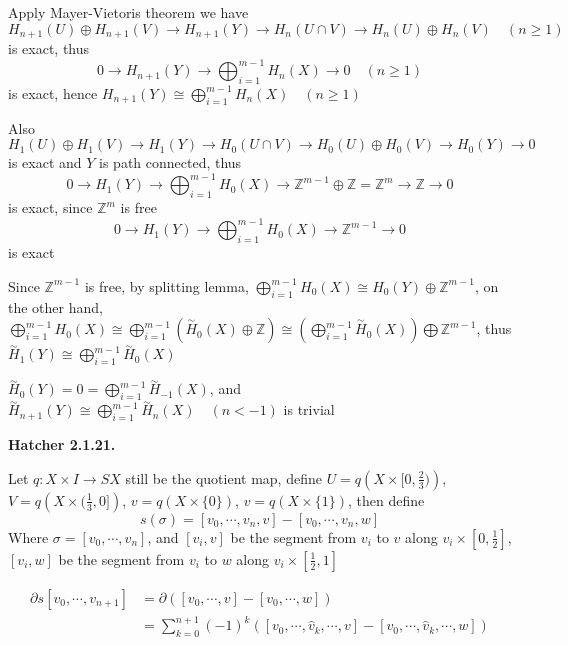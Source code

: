 \documentclass[../main.tex]{subfiles}
\begin{document}
Apply Mayer-Vietoris theorem we have
\[
H_{n+1}(U)\oplus H_{n+1}(V)\rightarrow H_{n+1}(Y)\rightarrow H_n(U\cap V)\rightarrow H_n(U)\oplus H_n(V) \quad (n\geq 1)
\]
is exact, thus
\[
0\rightarrow H_{n+1}(Y)\rightarrow \bigoplus_{i=1}^{m-1}H_n(X)\rightarrow 0 \quad (n\geq 1)
\]
is exact, hence $H_{n+1}(Y)\cong\bigoplus_{i=1}^{m-1}H_n(X)\quad (n\geq 1)$ \par
Also
\[
H_1(U)\oplus H_1(V)\rightarrow H_1(Y)\rightarrow H_0(U\cap V)\rightarrow H_0(U)\oplus H_0(V)\rightarrow H_0(Y)\rightarrow 0
\]
is exact and $Y$ is path connected, thus
\[
0\rightarrow H_1(Y)\rightarrow \bigoplus_{i=1}^{m-1}H_0(X)\rightarrow \mathbb{Z}^{m-1}\oplus\mathbb{Z}=\mathbb{Z}^m\rightarrow \mathbb{Z}\rightarrow 0
\]
is exact, since $\mathbb{Z}^m$ is free
\[
0\rightarrow H_1(Y)\rightarrow \bigoplus_{i=1}^{m-1}H_0(X)\rightarrow \mathbb{Z}^{m-1}\rightarrow 0
\]
is exact \par
Since $\mathbb{Z}^{m-1}$ is free, by splitting lemma, $\displaystyle\bigoplus_{i=1}^{m-1}H_0(X)\cong H_0(Y)\oplus\mathbb{Z}^{m-1}$, on the other hand, $\displaystyle\bigoplus_{i=1}^{m-1}H_0(X)\cong\bigoplus_{i=1}^{m-1}\left(\overset{\sim}{H}_0(X)\oplus\mathbb{Z}\right)\cong\left(\bigoplus_{i=1}^{m-1}\overset{\sim}{H}_0(X)\right)\bigoplus\mathbb{Z}^{m-1}$, thus $\displaystyle\overset{\sim}{H}_1(Y)\cong\bigoplus_{i=1}^{m-1}\overset{\sim}{H}_0(X)$ \par
$\displaystyle\overset{\sim}{H}_0(Y)=0=\bigoplus_{i=1}^{m-1}\overset{\sim}{H}_{-1}(X)$, and $\displaystyle\overset{\sim}{H}_{n+1}(Y)\cong\bigoplus_{i=1}^{m-1}\overset{\sim}{H}_n(X)\quad (n<-1)$ is trivial \par
\textbf{Hatcher 2.1.21.} \par
Let $q:X\times I\rightarrow SX$ still be the quotient map, define $U=q\left(X\times[0,\frac{2}{3})\right)$, $V=q\left(X\times(\frac{1}{3},0]\right)$, $v=q\left(X\times\{0\}\right)$, $v=q\left(X\times\{1\}\right)$, then define
$$s(\sigma)=[v_0,\cdots,v_n,v]-[v_0,\cdots,v_n,w]$$
Where $\sigma=[v_0,\cdots,v_n]$, and $[v_i,v]$ be the segment from $v_i$ to $v$ along $v_i\times\left[0,\frac{1}{2}\right]$, $[v_i,w]$ be the segment from $v_i$ to $w$ along $v_i\times\left[\frac{1}{2},1\right]$ \par
\[
\begin{aligned}
\partial s[v_0,\cdots,v_{n+1}]
&=\partial\left([v_0,\cdots,v]-[v_0,\cdots,w]\right) \\
&=\sum_{k=0}^{n+1}(-1)^k\left([v_0,\cdots,\hat{v}_k,\cdots,v]-[v_0,\cdots,\hat{v}_k,\cdots,w]\right)
\end{aligned}
\]
\end{document}
